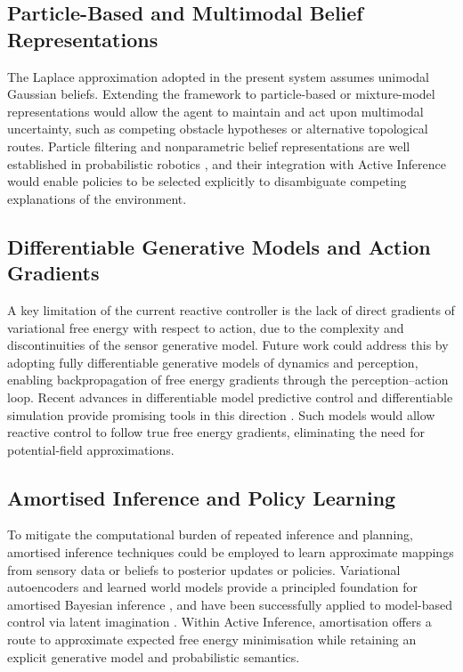 \documentclass[a4paper, twoside]{article}
\begin{document}
\subsection{Particle-Based and Multimodal Belief Representations}

The Laplace approximation adopted in the present system assumes unimodal Gaussian beliefs. Extending the framework to particle-based or mixture-model representations would allow the agent to maintain and act upon multimodal uncertainty, such as competing obstacle hypotheses or alternative topological routes. Particle filtering and nonparametric belief representations are well established in probabilistic robotics \cite{thrun2005probabilistic}, and their integration with Active Inference would enable policies to be selected explicitly to disambiguate competing explanations of the environment.

\subsection{Differentiable Generative Models and Action Gradients}

A key limitation of the current reactive controller is the lack of direct gradients of variational free energy with respect to action, due to the complexity and discontinuities of the sensor generative model. Future work could address this by adopting fully differentiable generative models of dynamics and perception, enabling backpropagation of free energy gradients through the perception–action loop. Recent advances in differentiable model predictive control and differentiable simulation provide promising tools in this direction \cite{amos2018differentiable, rempe2020differentiable}. Such models would allow reactive control to follow true free energy gradients, eliminating the need for potential-field approximations.

\subsection{Amortised Inference and Policy Learning}

To mitigate the computational burden of repeated inference and planning, amortised inference techniques could be employed to learn approximate mappings from sensory data or beliefs to posterior updates or policies. Variational autoencoders and learned world models provide a principled foundation for amortised Bayesian inference \cite{kingma2014vae}, and have been successfully applied to model-based control via latent imagination \cite{hafner2020dreamer}. Within Active Inference, amortisation offers a route to approximate expected free energy minimisation while retaining an explicit generative model and probabilistic semantics.
\end{document}
